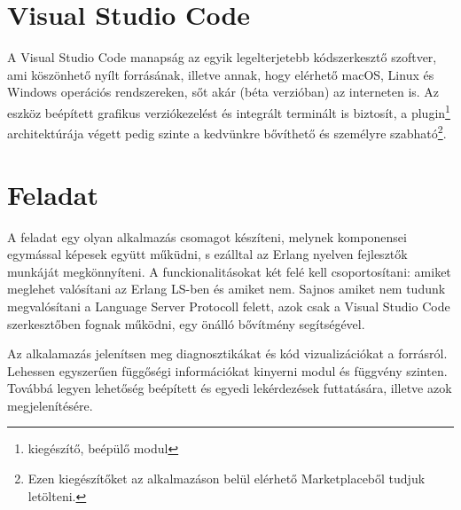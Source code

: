 \section{Visual Studio Code}
A Visual Studio Code manapság az egyik legelterjetebb kódszerkesztő szoftver, ami köszönhető nyílt forrásának, illetve annak, hogy elérhető macOS, Linux és Windows operációs rendszereken, sőt akár (béta verzióban) az interneten is. Az eszköz beépített grafikus verziókezelést és integrált terminált is biztosít, a plugin\footnote{kiegészítő, beépülő modul} architektúrája végett pedig szinte a kedvünkre bővíthető és személyre szabható\footnote{Ezen kiegészítőket az alkalmazáson belül elérhető Marketplaceből tudjuk letölteni.}.

\section{Feladat}

A feladat egy olyan alkalmazás csomagot készíteni, melynek komponensei egymással képesek együtt műküdni, s ezálltal az Erlang nyelven fejlesztők munkáját megkönnyíteni. A funckionalitásokat két felé kell csoportosítani: amiket meglehet valósítani az Erlang LS-ben és amiket nem. Sajnos amiket nem tudunk megvalósítani a Language Server Protocoll felett, azok csak a Visual Studio Code szerkesztőben fognak működni, egy önálló bővítmény segítségével.

Az alkalamazás jelenítsen meg diagnosztikákat és kód vizualizációkat a forrásról. Lehessen egyszerűen függőségi információkat kinyerni modul és függvény szinten. Továbbá legyen lehetőség beépített és egyedi lekérdezések futtatására, illetve azok megjelenítésére.